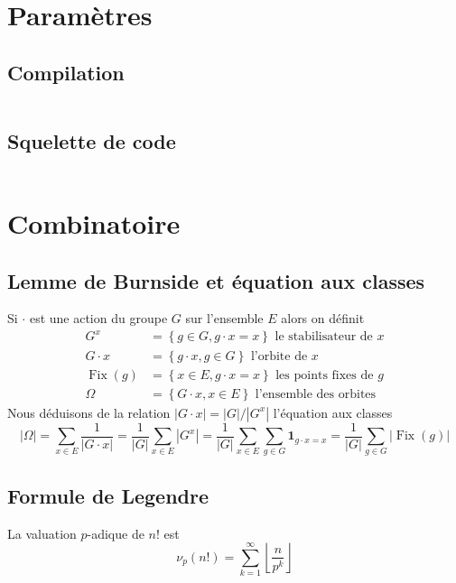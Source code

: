 \documentclass[10pt,twocolumn]{article}
\DeclareMathOperator{\Fix}{Fix}
\newcommand{\abs}[1]{\left\lvert{ #1 }\right\rvert}
\newcommand{\floor}[1]{\left\lfloor{ #1 }\right\rfloor}
\newcommand{\ind}{\mathbf 1}
\newcommand{\set}[1]{\left\lbrace #1 \right\rbrace}
\begin{document}
\rhead{\thepage/\pageref{LastPage}}
\lfoot{}
\cfoot{}
\rfoot{}

\tableofcontents

\section{Param\`etres}

\subsection{Compilation}
\inputminted[breaklines,tabsize=4]{bash}{code/compilation.sh}

\subsection{Squelette de code}
\inputminted[breaklines,tabsize=4]{cpp}{code/skeleton.cpp}

\section{Combinatoire}

\subsection{Lemme de Burnside et équation aux classes}

Si $\cdot$ est une action du groupe $G$ sur l'ensemble $E$ alors on définit
\begin{align*}
    G^x &= \set{g \in G, g \cdot x = x} \text{ le stabilisateur de $x$} \\
    G \cdot x &= \set{g \cdot x, g \in G} \text{ l'orbite de $x$} \\
    \Fix(g) &= \set{x \in E, g \cdot x = x} \text{ les points fixes de $g$} \\
    \Omega &= \set{G \cdot x, x \in E} \text{ l'ensemble des orbites}
\end{align*}
Nous déduisons de la relation $|G \cdot x| = |G| / |G^x|$ l'équation aux classes
$$
    \abs\Omega
    = \sum_{x \in E} \frac 1 {\abs{G\cdot x}}
    = \frac 1 {\abs G} \sum_{x \in E} \abs{G^x}
    = \frac 1 {\abs G} \sum_{x \in E} \sum_{g \in G} \ind_{g\cdot x = x}
    = \frac 1 {\abs G} \sum_{g \in G} \abs{\Fix(g)}
$$

\subsection{Formule de Legendre}
La valuation $p$-adique de $n!$ est
$$
\nu_p(n!) = \sum_{k = 1}^\infty \floor{\frac n {p^k}}
$$
\end{document}
